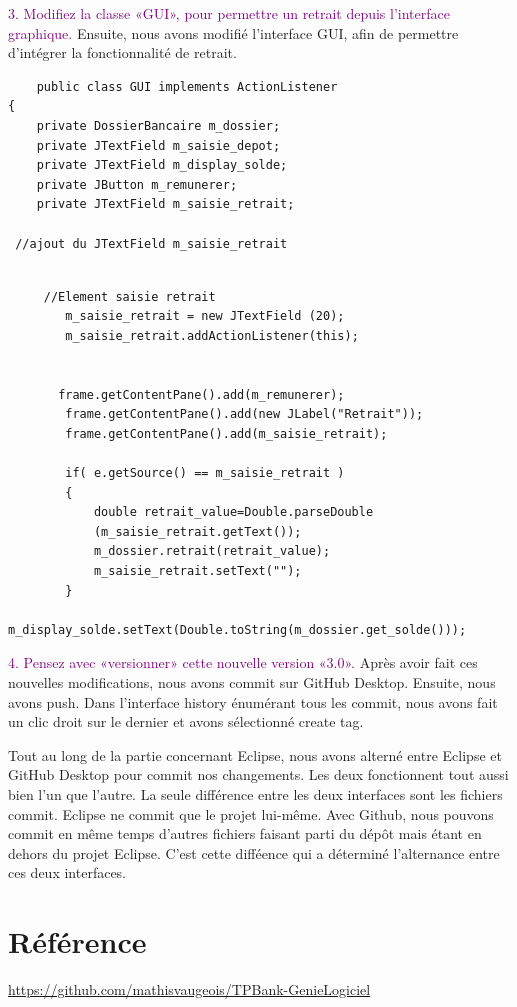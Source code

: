 \documentclass{article}
\begin{document}
\bigskip

\textcolor{Purple}{3. Modifiez la classe «GUI», pour permettre un retrait depuis l’interface graphique.}
\newline
Ensuite, nous avons modifié l'interface GUI, afin de permettre d'intégrer la fonctionnalité de retrait.

\begin{lstlisting}
    public class GUI implements ActionListener 
{
	private DossierBancaire m_dossier;
	private JTextField m_saisie_depot;
	private JTextField m_display_solde;
	private JButton m_remunerer;
	private JTextField m_saisie_retrait;

 //ajout du JTextField m_saisie_retrait
	
\end{lstlisting}
\begin{lstlisting}
     //Element saisie retrait
        m_saisie_retrait = new JTextField (20);
        m_saisie_retrait.addActionListener(this);


       frame.getContentPane().add(m_remunerer); 
        frame.getContentPane().add(new JLabel("Retrait"));
        frame.getContentPane().add(m_saisie_retrait);

        if( e.getSource() == m_saisie_retrait )
    	{
    		double retrait_value=Double.parseDouble
            (m_saisie_retrait.getText());
    		m_dossier.retrait(retrait_value);
    		m_saisie_retrait.setText("");
    	}
    	m_display_solde.setText(Double.toString(m_dossier.get_solde())); 
\end{lstlisting}

\bigskip

\textcolor{Purple}{4. Pensez avec «versionner» cette nouvelle version «3.0».}
\newline
Après avoir fait ces nouvelles modifications, nous avons commit sur GitHub Desktop. Ensuite, nous avons push. Dans l'interface history énumérant tous les commit, nous avons fait un clic droit sur le dernier et avons sélectionné create tag.

Tout au long de la partie concernant Eclipse, nous avons alterné entre Eclipse et GitHub Desktop pour commit nos changements. Les deux fonctionnent tout aussi bien l'un que l'autre. La seule différence entre les deux interfaces sont les fichiers commit. Eclipse ne commit que le projet lui-même. Avec Github, nous pouvons commit en même temps d'autres fichiers faisant parti du dépôt mais étant en dehors du projet Eclipse. C'est cette difféence qui a déterminé l'alternance entre ces deux interfaces.
\section*{Référence}
\url{https://github.com/mathisvaugeois/TPBank-GenieLogiciel}
\end{document}
